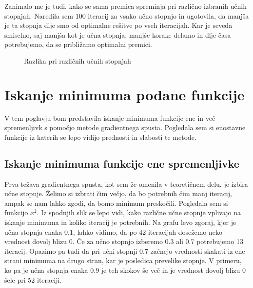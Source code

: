 \documentclass{article}
\begin{document}
\newpage
\noindent Zanimalo me je tudi, kako se sama premica spreminja pri različno izbranih učnih stopnjah. Naredila sem 100 iteracij za vsako učno stopnjo in ugotovila, da manjša je ta stopnja dlje smo od optimalne rešitve po vseh iteracijah. Kar je seveda smiselno, saj manjša kot je učna stopnja, manjše korake delamo in dlje časa potrebujemo, da se približamo optimalni premici.

\begin{figure}[!htb]
\centering
{} 
\caption{Razlika pri različnih učnih stopnjah}
\label{fig:foobar}
\end{figure}



\newpage
\section{Iskanje minimuma podane funkcije}
V tem poglavju bom predstavila iskanje minimuma funkcije ene in več spremenljivk s pomočjo metode gradientnega spusta. Pogledala sem si enostavne funkcije iz katerih se lepo vidijo prednosti in slabosti te metode.\\
\subsection{Iskanje minimuma funkcije ene spremenljivke}

\noindent Prva težava gradientnega spusta, kot sem že omenila v teoretičnem delu, je izbira učne stopnje. Želimo si izbrati čim večjo, da bo potrebnih čim manj iteracij, ampak se nam lahko zgodi, da bomo minimum preskočili. Pogledala sem si funkcijo $x^2$. Iz spodnjih slik se lepo vidi, kako različne učne stopnje vplivajo na iskanje minimuma in koliko iteracij je potrebnih. Na grafu levo zgoraj, kjer je učna stopnja enaka 0.1, lahko vidimo, da po 42 iteracijah dosežemo neko vrednost dovolj blizu 0. Če za učno stopnjo izberemo 0.3 ali 0.7 potrebujemo 13 iteracij. Opazimo pa tudi da pri učni stopnji 0.7 začnejo vrednosti skakati iz ene strani minimuma na drugo stran, kar je posledica prevelike stopnje. V primeru, ko pa je učna stopnja enaka 0.9 je teh skokov še več in je vrednost dovolj blizu 0 šele pri 52 iteraciji.
\end{document}
